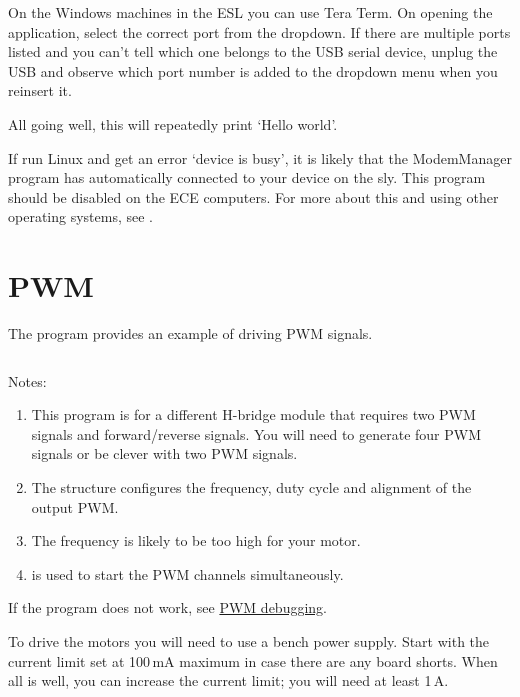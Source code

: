 On the Windows machines in the ESL you can use Tera Term. On opening the
application, select the correct  port from the 
dropdown. If there are multiple  ports listed and you can't
tell which one belongs to the USB serial device, unplug the USB and
observe which  port number is added to the dropdown menu when
you reinsert it.

All going well, this will repeatedly print `Hello world'.

If run Linux and get an error `device is busy', it is likely that the
ModemManager program has automatically connected to your device on the
sly. This program should be disabled on the ECE computers. For more
about this and using other operating systems, see .

\section{PWM}
\label{pwm-test}

The program  provides an
example of driving PWM signals.

\inputminted{C}{../../src/test-apps/pwm_test2/pwm_test2.c}

Notes:
%
\begin{enumerate}
\item
  This program is for a different H-bridge module that requires two
  PWM signals and forward/reverse signals. You will need to generate
  four PWM signals or be clever with two PWM signals.

\item
  The  structure configures the frequency, duty cycle
  and alignment of the output PWM.

\item The frequency is likely to be too high for your motor.

\item {} is used to start the PWM channels
  simultaneously.
\end{enumerate}

If the program does not work, see  \hyperref[debugging-pwm]{PWM debugging}.

To drive the motors you will need to use a bench power supply. Start
with the current limit set at 100\,mA maximum in case there are any
board shorts.  When all is well, you can increase the current limit;
you will need at least 1\,A.

